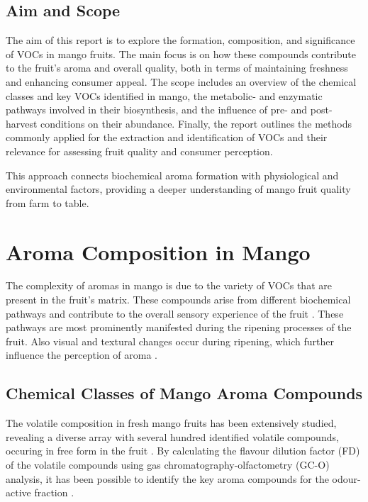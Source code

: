 \subsection{Aim and Scope}
The aim of this report is to explore the formation, composition, and significance of VOCs in mango fruits. The main focus is on how these compounds contribute to the fruit's aroma and overall quality, both in terms of maintaining freshness and enhancing consumer appeal.
The scope includes an overview of the chemical classes and key VOCs identified in mango, the metabolic- and enzymatic pathways involved in their biosynthesis, and the influence of pre- and post-harvest conditions on their abundance. Finally, the report outlines the methods commonly applied for the extraction and identification of VOCs and their relevance for assessing fruit quality and consumer perception.

\vspace{1em}
This approach connects biochemical aroma formation with physiological and environmental factors, providing a deeper understanding of mango fruit quality from farm to table.


\section{Aroma Composition in Mango}
The complexity of aromas in mango is due to the variety of VOCs that are present in the fruit's matrix. These compounds arise from different biochemical pathways and contribute to the overall sensory experience of the fruit \cite*{A05_Chin2019}. These pathways are most prominently manifested during the ripening processes of the fruit. Also visual and textural changes occur during ripening, which further influence the perception of aroma \cite*{A01_Aguirre-Lopez_2023, A05_Chin2019}.

\subsection{Chemical Classes of Mango Aroma Compounds}
The volatile composition in fresh mango fruits has been extensively studied, revealing a diverse array with several hundred identified volatile compounds, occuring in free form in the fruit \cite*{A07_Bonneau2016}. By calculating the flavour dilution factor (FD) of the volatile compounds using gas chromatography-olfactometry (GC-O) analysis, it has been possible to identify the key aroma compounds for the odour-active fraction \cite*{A07_Bonneau2016}.

